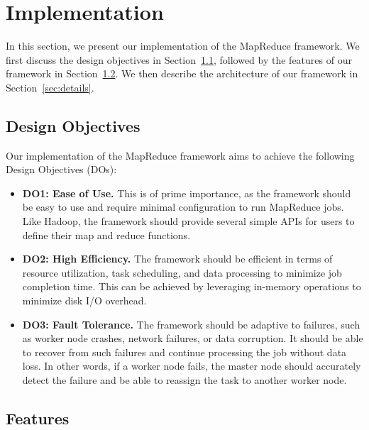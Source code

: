 \section{Implementation}
\label{sec:implementation}

In this section, we present our implementation of the MapReduce framework. We first discuss the design objectives in Section~\ref{sec:design}, followed by the features of our framework in Section~\ref{sec:features}. We then describe the architecture of our framework in Section~\ref{sec:details}.

\subsection{Design Objectives}
\label{sec:design}

Our implementation of the MapReduce framework aims to achieve the following Design Objectives (DOs):

\begin{itemize}
    \item \textbf{DO1: Ease of Use.} This is of prime importance, as the framework should be easy to use and require minimal configuration to run MapReduce jobs. Like Hadoop, the framework should provide several simple APIs for users to define their map and reduce functions.
    \item \textbf{DO2: High Efficiency.} The framework should be efficient in terms of resource utilization, task scheduling, and data processing to minimize job completion time. This can be achieved by leveraging in-memory operations to minimize disk I/O overhead.
    \item \textbf{DO3: Fault Tolerance.} The framework should be adaptive to failures, such as worker node crashes, network failures, or data corruption. It should be able to recover from such failures and continue processing the job without data loss. In other words, if a worker node fails, the master node should accurately detect the failure and be able to reassign the task to another worker node.
\end{itemize}

\subsection{Features}
\label{sec:features}

